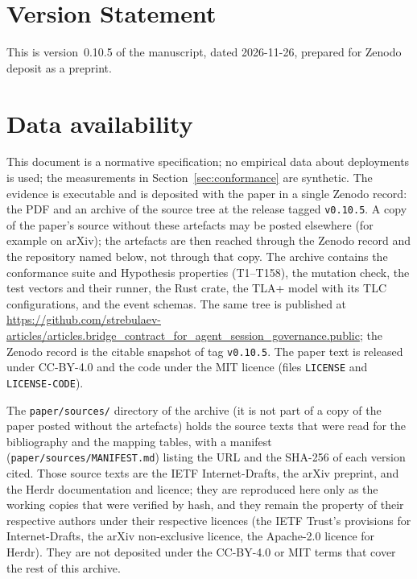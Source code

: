 \section*{Version Statement}

This is version~0.10.5 of the manuscript, dated
2026-11-26, prepared for Zenodo
deposit as a preprint.

\section*{Data availability}

This document is a normative specification; no empirical data about deployments is
used; the measurements in Section~\ref{sec:conformance} are synthetic. The evidence is executable and is deposited with the paper in a
single Zenodo record: the PDF and an archive of the source tree at the
release tagged \texttt{v0.10.5}. A copy of the paper's source without these
artefacts may be posted elsewhere (for example on arXiv); the artefacts are
then reached through the Zenodo record and the repository named below, not
through that copy. The archive contains the conformance suite and Hypothesis
properties (T1--T158), the mutation check, the test vectors and their runner,
the Rust crate, the TLA+ model with its TLC configurations, and the event
schemas. The same tree is published at
\url{https://github.com/strebulaev-articles/articles.bridge_contract_for_agent_session_governance.public};
the Zenodo record is the citable snapshot of tag \texttt{v0.10.5}. The paper text is released under
CC-BY-4.0 and the code under the MIT licence (files \texttt{LICENSE} and
\texttt{LICENSE-CODE}).

The \texttt{paper/sources/} directory of the archive (it is not part of a copy
of the paper posted without the artefacts) holds the source
texts that were read for the bibliography and the mapping tables, with a
manifest (\texttt{paper/sources/MANIFEST.md}) listing the URL and the
SHA-256 of each version cited. Those source texts are the IETF
Internet-Drafts, the arXiv preprint, and the Herdr documentation and
licence; they are reproduced here only as the working copies that were
verified by hash, and they remain the property of their respective
authors under their respective licences (the IETF Trust's provisions for
Internet-Drafts, the arXiv non-exclusive licence, the Apache-2.0
licence for Herdr). They are not deposited under the CC-BY-4.0 or MIT
terms that cover the rest of this archive.

